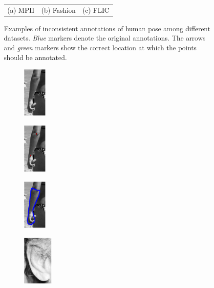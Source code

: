 \begin{figure}[t!]
\begin{tabular}{ccc}
        \\
        (a) MPII
        &
        (b) Fashion
        &
        (c) FLIC
        \end{tabular}
    \caption{Examples of inconsistent annotations of human pose among different datasets. \emph{Blue} markers denote the original annotations. The arrows and \emph{green} markers show the correct location at which the points should be annotated.}
    \label{fig:wrong_anno}
\end{figure}
\begin{figure}[t!]
    \centering
    \begin{subfigure}[b]{0.065\textwidth}
            \includegraphics[height=2.55cm]{resources/Fig_Intro/intro_2_0}
    \end{subfigure}
    \hfill
    \begin{subfigure}[b]{0.065\textwidth}
            \includegraphics[height=2.55cm]{resources/Fig_Intro/intro_2_1}
    \end{subfigure}
    \hfill
    \begin{subfigure}[b]{0.065\textwidth}
            \includegraphics[height=2.55cm]{resources/Fig_Intro/intro_2_2}
    \end{subfigure}
    \hfill
    \begin{subfigure}[b]{0.085\textwidth}
            \includegraphics[height=2.55cm]{resources/Fig_Intro/intro_1_0}

\end{subfigure}
\end{figure}
